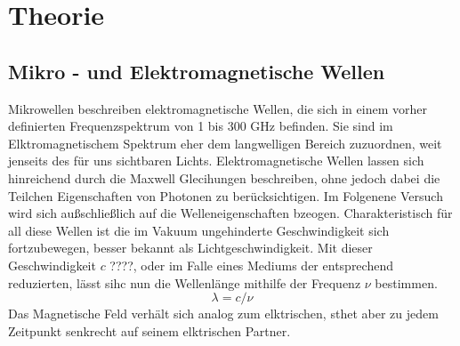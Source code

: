 \section{Theorie}

\subsection{Mikro - und Elektromagnetische Wellen }
Mikrowellen beschreiben elektromagnetische Wellen, die sich in einem vorher definierten Frequenzspektrum von 1 bis 300 $\si{\giga\hertz}$ befinden. 
Sie sind im Elktromagnetischem Spektrum eher dem langwelligen Bereich zuzuordnen, weit jenseits des für uns sichtbaren Lichts.
Elektromagnetische Wellen lassen sich hinreichend durch die Maxwell Glecihungen beschreiben, ohne jedoch dabei die Teilchen Eigenschaften von Photonen zu berücksichtigen. Im Folgenene Versuch wird sich außschließlich auf die Welleneigenschaften bzeogen.
Charakteristisch für all diese Wellen ist die im Vakuum ungehinderte Geschwindigkeit sich fortzubewegen, besser bekannt als Lichtgeschwindigkeit. 
Mit dieser Geschwindigkeit $c$ ????, oder im Falle eines Mediums der entsprechend reduzierten, lässt sihc nun die Wellenlänge mithilfe der Frequenz $\nu$ bestimmen.
\begin{equation}
\lambda = c/{\nu}
\end{equation}
Das Magnetische Feld verhält sich analog zum elktrischen, sthet aber zu jedem Zeitpunkt senkrecht auf seinem elktrischen Partner. 